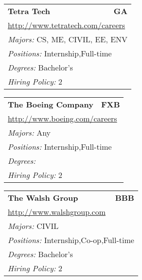 \documentclass[twoside]{article}
\begin{document}
\begin{center}
\begin{multicols}{3}
\begin{FlushLeft}
\begin{minipage}{.9\columnwidth}
\end{minipage}
 
\begin{minipage}{.9\columnwidth}\begin{tabularx}{.95\columnwidth}{Xr}
                 {\Large\bf Tetra Tech} & {\Large\bf GA}\\
    \multicolumn{2}{p{.95\columnwidth}}{\url{http://www.tetratech.com/careers}}\\
    \multicolumn{2}{p{.95\columnwidth}}{\emph{Majors:} CS, ME, CIVIL, EE, ENV}\\
    \multicolumn{2}{p{.95\columnwidth}}{\emph{Positions:} Internship,Full-time}\\
    \multicolumn{2}{p{.95\columnwidth}}{\emph{Degrees:} Bachelor's}\\
    \multicolumn{2}{p{.95\columnwidth}}{\emph{Hiring Policy:} 2}\\
    \end{tabularx}
    
\end{minipage}
 
\begin{minipage}{.9\columnwidth}\begin{tabularx}{.95\columnwidth}{Xr}
                 {\Large\bf The Boeing Company} & {\Large\bf FXB}\\
    \multicolumn{2}{p{.95\columnwidth}}{\url{http://www.boeing.com/careers}}\\
    \multicolumn{2}{p{.95\columnwidth}}{\emph{Majors:} Any}\\
    \multicolumn{2}{p{.95\columnwidth}}{\emph{Positions:} Internship,Full-time}\\
    \multicolumn{2}{p{.95\columnwidth}}{\emph{Degrees:} }\\
    \multicolumn{2}{p{.95\columnwidth}}{\emph{Hiring Policy:} 2}\\
    \end{tabularx}
    
\end{minipage}
 
\begin{minipage}{.9\columnwidth}\begin{tabularx}{.95\columnwidth}{Xr}
                 {\Large\bf The Walsh Group} & {\Large\bf BBB}\\
    \multicolumn{2}{p{.95\columnwidth}}{\url{http://www.walshgroup.com}}\\
    \multicolumn{2}{p{.95\columnwidth}}{\emph{Majors:} CIVIL}\\
    \multicolumn{2}{p{.95\columnwidth}}{\emph{Positions:} Internship,Co-op,Full-time}\\
    \multicolumn{2}{p{.95\columnwidth}}{\emph{Degrees:} Bachelor's}\\
    \multicolumn{2}{p{.95\columnwidth}}{\emph{Hiring Policy:} 2}\\
    \end{tabularx}
    

\end{minipage}
\end{FlushLeft}
\end{multicols}
\end{center}
\end{document}
